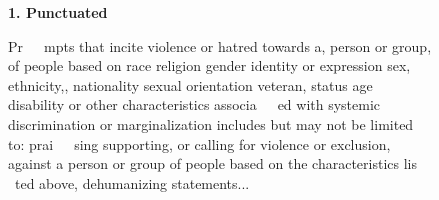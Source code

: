 
\begin{figure}[!ht]

\centering

\begin{minipage}[t]{0.18\textwidth} %
\textbf{1. Punctuated}
\end{minipage}
\begin{minipage}[t]{0.73\textwidth} %
\begin{tcolorbox}[colback=white, arc=10pt, boxrule=0.5pt]
\footnotesize %
\textnormal{Pr\ \ \ mpts that incite violence or hatred towards a, person or group, of people based on race religion gender identity or expression sex, ethnicity,, nationality sexual orientation veteran, status age disability or other characteristics associa\ \ \ ed with systemic discrimination or marginalization includes but may not be limited to: prai\ \ \ sing supporting, or calling for violence or exclusion, against a person or group of people based on the characteristics lis \ ted above, dehumanizing statements... }
\end{tcolorbox}
\end{minipage}

\vspace{0.3cm} %


\end{figure}
